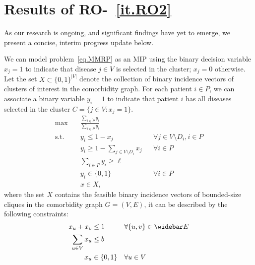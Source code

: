 \section{Results of RO-~\ref{it.RO2}}
As our research is ongoing, and significant findings have yet to emerge, we present a concise, interim progress update below.

We can model  problem~\eqref{eq.MMRP} as an MIP using the binary decision variable $x_j =1$ to indicate that disease $j \in V$ is selected in the cluster; $x_j =0$ otherwise. Let the set $X \subset \{0,1\}^{|V|}$ denote the collection of binary incidence vectors of clusters of interest in the comorbidity graph. For each patient $i \in P$, we can associate a binary variable  $y_i =1$ to indicate that patient $i$ has all diseases selected in the cluster $C = \{j\in V: x_j=1\}$. 
\begin{subequations}\label{form.fpRO2}
\begin{align}
  \max \quad & \frac{\sum\limits_{i \in \widetilde{P}} y_i}{\sum\limits_{i \in P} y_i} \label{eq.fraclinearFPRO2} &&\\
\text{s.t.} \quad 
\label{eq.xyconnectupper-disaggFPRO2}  &y_i \le   1- x_j  && \forall j \in V\setminus D_i,  i \in P\\
 \label{eq.xyconnectlowerFPRO2}& y_i \ge 1-\sum_{j \in V\setminus D_i}x_j  &&\forall i \in P\\
 \label{eq.denomLBFPRO2} & \sum_{i \in P} y_i \ge \ell &&\\
 \label{eq.ybinFPRO2}  & y_i \in \{0,1\}  &&\forall i \in P \\
 \label{eq.xin X} & x \in X, & 
\end{align}
\end{subequations}
where the set $X$ contains the feasible binary incidence vectors of bounded-size cliques in the comorbidity graph $G=(V,E)$, it can be described by the following constraints:
\begin{subequations}\label{form.clqedgecons4X}
\begin{align}
  {x}_u + {x}_v &\le 1 && \forall \{u,v\} \in  \widebar E\\
 \sum_{u \in V} {x}_u &\le b  && \\
x_u &\in \{0,1\} &&\forall u \in V     
\end{align}
\end{subequations}

